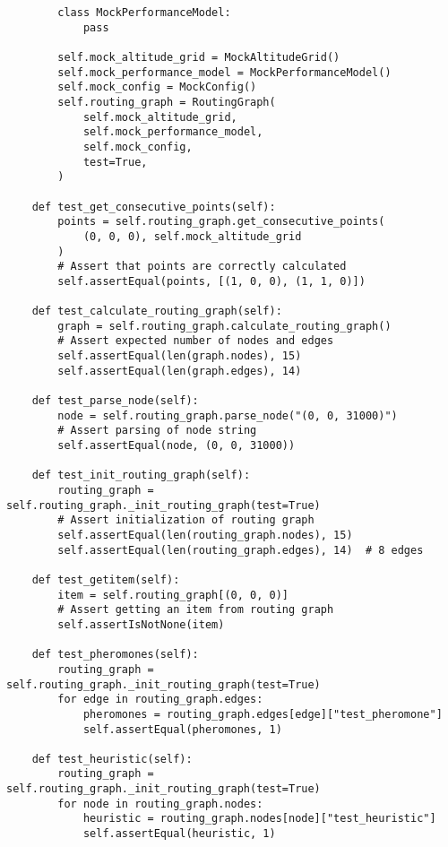 \begin{verbatim}
        class MockPerformanceModel:
            pass

        self.mock_altitude_grid = MockAltitudeGrid()
        self.mock_performance_model = MockPerformanceModel()
        self.mock_config = MockConfig()
        self.routing_graph = RoutingGraph(
            self.mock_altitude_grid,
            self.mock_performance_model,
            self.mock_config,
            test=True,
        )

    def test_get_consecutive_points(self):
        points = self.routing_graph.get_consecutive_points(
            (0, 0, 0), self.mock_altitude_grid
        )
        # Assert that points are correctly calculated
        self.assertEqual(points, [(1, 0, 0), (1, 1, 0)])

    def test_calculate_routing_graph(self):
        graph = self.routing_graph.calculate_routing_graph()
        # Assert expected number of nodes and edges
        self.assertEqual(len(graph.nodes), 15)
        self.assertEqual(len(graph.edges), 14)

    def test_parse_node(self):
        node = self.routing_graph.parse_node("(0, 0, 31000)")
        # Assert parsing of node string
        self.assertEqual(node, (0, 0, 31000))

    def test_init_routing_graph(self):
        routing_graph = self.routing_graph._init_routing_graph(test=True)
        # Assert initialization of routing graph
        self.assertEqual(len(routing_graph.nodes), 15)
        self.assertEqual(len(routing_graph.edges), 14)  # 8 edges

    def test_getitem(self):
        item = self.routing_graph[(0, 0, 0)]
        # Assert getting an item from routing graph
        self.assertIsNotNone(item)

    def test_pheromones(self):
        routing_graph = self.routing_graph._init_routing_graph(test=True)
        for edge in routing_graph.edges:
            pheromones = routing_graph.edges[edge]["test_pheromone"]
            self.assertEqual(pheromones, 1)

    def test_heuristic(self):
        routing_graph = self.routing_graph._init_routing_graph(test=True)
        for node in routing_graph.nodes:
            heuristic = routing_graph.nodes[node]["test_heuristic"]
            self.assertEqual(heuristic, 1)

\end{verbatim}
